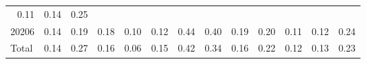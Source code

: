 \begin{table}[!h]
\begin{tabular}{lllllllllllll}
  \multicolumn{1}{r}{0.11} &
  \multicolumn{1}{r}{0.14} &
  \multicolumn{1}{r}{0.25} \\
\multicolumn{1}{l}{\hspace{1em}20206} &
  \multicolumn{1}{|r}{0.14} &
  \multicolumn{1}{r}{0.19} &
  \multicolumn{1}{r}{0.18} &
  \multicolumn{1}{r}{0.10} &
  \multicolumn{1}{r}{0.12} &
  \multicolumn{1}{r}{0.44} &
  \multicolumn{1}{r}{0.40} &
  \multicolumn{1}{r}{0.19} &
  \multicolumn{1}{r}{0.20} &
  \multicolumn{1}{r}{0.11} &
  \multicolumn{1}{r}{0.12} &
  \multicolumn{1}{r}{0.24} \\
\multicolumn{1}{l}{\hspace{1em}Total} &
  \multicolumn{1}{|r}{0.14} &
  \multicolumn{1}{r}{0.27} &
  \multicolumn{1}{r}{0.16} &
  \multicolumn{1}{r}{0.06} &
  \multicolumn{1}{r}{0.15} &
  \multicolumn{1}{r}{0.42} &
  \multicolumn{1}{r}{0.34} &
  \multicolumn{1}{r}{0.16} &
  \multicolumn{1}{r}{0.22} &
  \multicolumn{1}{r}{0.12} &
  \multicolumn{1}{r}{0.13} &
  \multicolumn{1}{r}{0.23} \\
\cline{1-13}
\end{tabular}
\end{table}

